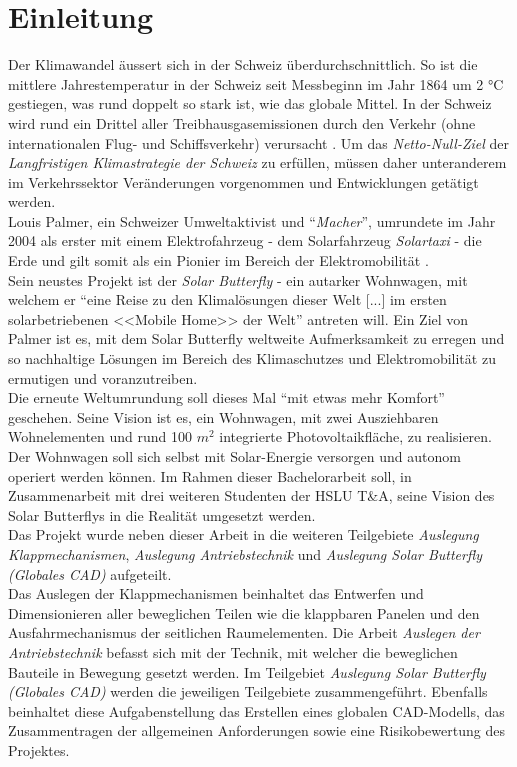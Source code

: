 \section{Einleitung}
Der Klimawandel äussert sich in der Schweiz überdurchschnittlich. So ist die mittlere Jahrestemperatur in der Schweiz seit Messbeginn im Jahr 1864 um 2 °C gestiegen, was rund doppelt so stark ist, wie das globale Mittel. In der Schweiz wird rund ein Drittel aller Treibhausgasemissionen durch den Verkehr (ohne internationalen Flug- und Schiffsverkehr) verursacht \cite{BAFU}. Um das \emph{Netto-Null-Ziel} der \emph{Langfristigen Klimastrategie der Schweiz} zu erfüllen, müssen daher unteranderem im Verkehrssektor Veränderungen vorgenommen und Entwicklungen getätigt werden.\\
Louis Palmer, ein Schweizer Umweltaktivist und ``\emph{Macher}'', umrundete im Jahr 2004 als erster mit einem Elektrofahrzeug - dem Solarfahrzeug \emph{Solartaxi} - die Erde und gilt somit als ein Pionier im Bereich der Elektromobilität \cite{Palmer}.\\
Sein neustes Projekt ist der \emph{Solar Butterfly} - ein autarker Wohnwagen, mit welchem er ``eine Reise zu den Klimalösungen dieser Welt [...] im ersten solarbetriebenen <<Mobile Home>> der Welt'' antreten will. Ein Ziel von Palmer ist es, mit dem Solar Butterfly weltweite Aufmerksamkeit zu erregen und so nachhaltige Lösungen im Bereich des Klimaschutzes und Elektromobilität zu ermutigen und voranzutreiben.\\
Die erneute Weltumrundung soll dieses Mal ``mit etwas mehr Komfort'' geschehen. Seine Vision ist es, ein Wohnwagen, mit zwei Ausziehbaren Wohnelementen und rund 100 $m^2$ integrierte Photovoltaikfläche, zu realisieren. Der Wohnwagen soll sich selbst mit Solar-Energie versorgen und autonom operiert werden können. Im Rahmen dieser Bachelorarbeit soll, in Zusammenarbeit mit drei weiteren Studenten der HSLU T\&A, seine Vision des Solar Butterflys in die Realität umgesetzt werden.\\
Das Projekt wurde neben dieser Arbeit in die weiteren Teilgebiete \emph{Auslegung Klappmechanismen}, \emph{Auslegung Antriebstechnik} und \emph{Auslegung Solar Butterfly (Globales CAD)} aufgeteilt.\\
Das Auslegen der Klappmechanismen beinhaltet das Entwerfen und Dimensionieren aller beweglichen Teilen wie die klappbaren Panelen und den Ausfahrmechanismus der seitlichen Raumelementen. Die Arbeit \emph{Auslegen der Antriebstechnik} befasst sich mit der Technik, mit welcher die beweglichen Bauteile in Bewegung gesetzt werden. Im Teilgebiet \emph{Auslegung Solar Butterfly (Globales CAD)} werden die jeweiligen Teilgebiete zusammengeführt. Ebenfalls beinhaltet diese Aufgabenstellung das Erstellen eines globalen CAD-Modells, das Zusammentragen der allgemeinen Anforderungen sowie eine Risikobewertung des Projektes.

